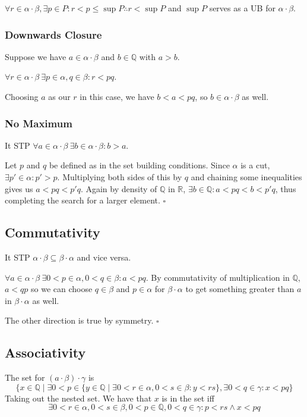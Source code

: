 \documentclass[12pt]{article}
\newcommand{\R}{\mathbb{R}}
\newcommand{\Q}{\mathbb{Q}}
\begin{document}
$\forall r \in \alpha \cdot \beta, \exists p \in P: r < p \le \sup P \therefore r < \sup P$
and $\sup P$ serves as a UB for $\alpha \cdot \beta$.

\subsubsection{Downwards Closure}

Suppose we have $a \in \alpha \cdot \beta$ and $b \in \Q$ with $a>b$.

$\forall r \in \alpha \cdot \beta\ \exists p \in \alpha, q \in \beta: r < pq$.

Choosing $a$ as our $r$ in this case, we have $b<a<pq$, so $b \in \alpha \cdot \beta$ as well.

\subsubsection{No Maximum}

It STP $\forall a \in \alpha \cdot \beta\ \exists b \in \alpha \cdot \beta: b > a$.

Let $p$ and $q$ be defined as in the set building conditions.
Since $\alpha$ is a cut, $\exists p' \in \alpha: p' > p$.
Multiplying both sides of this by $q$ and chaining some inequalities gives us $a < pq < p'q$.
Again by density of $\Q$ in $\R$, $\exists b \in \Q: a < pq < b < p'q$,
thus completing the search for a larger element. $\square$

\subsection{Commutativity}

It STP $\alpha \cdot \beta \subseteq \beta \cdot \alpha$ and vice versa.

$\forall a \in \alpha \cdot \beta\ \exists 0 < p \in \alpha, 0 < q \in \beta: a < pq$.
By commutativity of multiplication in $\Q$, $a<qp$ so
we can choose $q \in \beta$ and $p \in \alpha$ for $\beta \cdot \alpha$
to get something greater than $a$ in $\beta \cdot \alpha$ as well.

The other direction is true by symmetry. $\square$

\subsection{Associativity}

The set for $(a \cdot \beta) \cdot \gamma$ is
\[\{x \in \Q \mid \exists 0 < p \in \{y \in \Q \mid \exists 0 < r \in \alpha, 0 < s \in \beta: y < rs\}, \exists 0 < q \in \gamma: x < pq\}\]
Taking out the nested set. We have that $x$ is in the set iff
\[\exists 0 < r \in \alpha, 0 < s \in \beta, 0 < p \in \Q, 0 < q \in \gamma: p < rs \land x < pq\]
\end{document}
